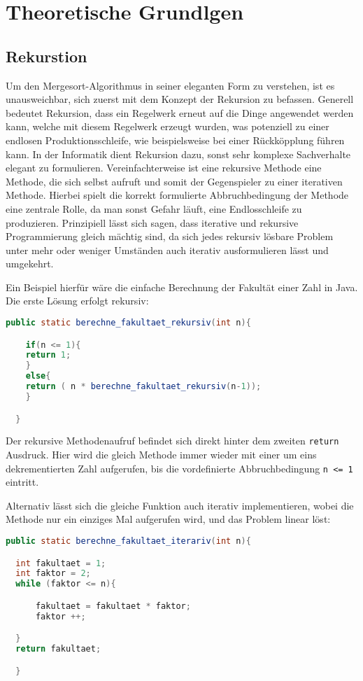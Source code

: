 \chapter{Theoretische Grundlgen}\label{chap:theoretische-grundlagen}
\section{Rekurstion}
Um den Mergesort-Algorithmus in seiner eleganten Form zu verstehen, ist es unausweichbar, sich zuerst mit dem
Konzept der Rekursion zu befassen. Generell bedeutet Rekursion, dass ein Regelwerk erneut auf die Dinge angewendet werden kann,
welche mit diesem Regelwerk erzeugt wurden, was potenziell zu einer endlosen Produktionsschleife, wie beispielsweise bei einer Rückköpplung
führen kann. In der Informatik dient Rekursion dazu, sonst sehr komplexe Sachverhalte elegant zu formulieren. Vereinfachterweise ist eine rekursive Methode
eine Methode, die sich selbst aufruft und somit der Gegenspieler zu einer iterativen Methode. Hierbei spielt die korrekt formulierte Abbruchbedingung der Methode eine zentrale Rolle, da man sonst Gefahr läuft,
eine Endlosschleife zu produzieren. Prinzipiell lässt sich sagen, dass iterative und rekursive Programmierung gleich mächtig sind, da sich jedes rekursiv lösbare Problem
unter mehr oder weniger Umständen auch iterativ ausformulieren lässt und umgekehrt.

Ein Beispiel hierfür wäre die einfache Berechnung der Fakultät einer Zahl in Java. Die erste Lösung erfolgt rekursiv:

\begin{lstlisting}[language=Java]
  public static berechne_fakultaet_rekursiv(int n){

    if(n <= 1){
    return 1;
    }
    else{
    return ( n * berechne_fakultaet_rekursiv(n-1));
    }

  }
\end{lstlisting}

Der rekursive Methodenaufruf befindet sich direkt hinter dem zweiten \texttt{return} Ausdruck. Hier wird die gleich Methode immer wieder
mit einer um eins dekrementierten Zahl aufgerufen, bis die vordefinierte Abbruchbedingung \texttt{n <= 1} eintritt.

Alternativ lässt sich die gleiche Funktion auch iterativ implementieren, wobei die Methode nur ein einziges Mal aufgerufen wird,
und das Problem linear löst:

\begin{lstlisting}[language=Java]
  public static berechne_fakultaet_iterariv(int n){

  int fakultaet = 1;
  int faktor = 2;
  while (faktor <= n){

      fakultaet = fakultaet * faktor;
      faktor ++;

  }
  return fakultaet;

  }
\end{lstlisting}

